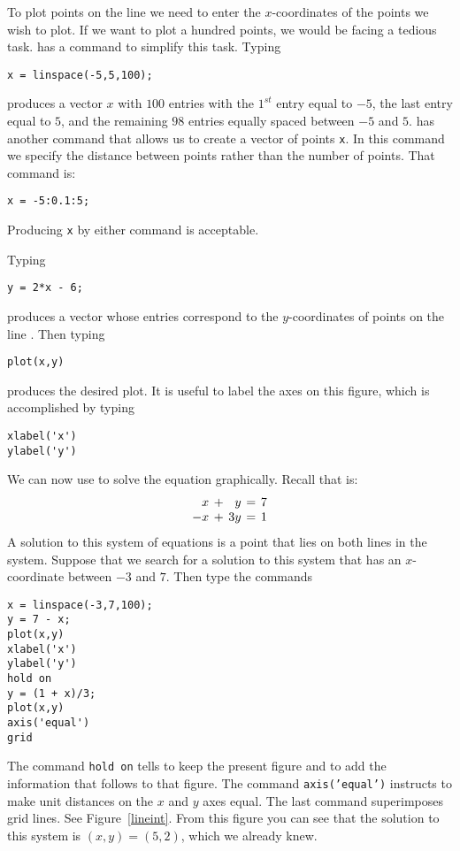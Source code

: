 To plot points on the line
 we need to enter the $x$-coordinates of the points
we wish to plot.  If we want to plot a hundred points, we would
be facing a tedious task.  \Matlab has a command to simplify
this task. Typing
\begin{verbatim}
x = linspace(-5,5,100);
\end{verbatim} 
produces a vector $x$ with $100$ entries with the $1^{st}$ entry
equal to $-5$, the last entry equal to $5$, and the remaining $98$ 
entries equally spaced between $-5$ and $5$.  \Matlab has another command 
that allows us to create a vector of points {\tt x}.  In this command
we specify the distance between points rather than the number of 
points.  That command is:
\begin{verbatim}
x = -5:0.1:5;
\end{verbatim}
Producing {\tt x} by either command is acceptable.

Typing
\begin{verbatim}
y = 2*x - 6;
\end{verbatim}
produces a vector whose entries correspond to the
$y$-coordinates of points on the line .  Then typing
\begin{verbatim}
plot(x,y)
\end{verbatim}
produces the desired plot.  It is useful to label the axes on
this figure, which is accomplished by typing
\begin{verbatim}
xlabel('x')
ylabel('y')
\end{verbatim} 

We can now use \Matlab to solve the equation 
graphically.  Recall that  is:
\[
\arraycolsep 2pt
\begin{array}{rcrcr}
 x & + &  y & = & 7 \\
-x & + & 3y & = & 1
\end{array}
\]
A solution to this system of equations is a point that lies on
both lines in the system.  Suppose that we search for a solution
to this system that has an $x$-coordinate between $-3$ and $7$.
Then type the commands
\begin{verbatim}
x = linspace(-3,7,100);
y = 7 - x;
plot(x,y)
xlabel('x')
ylabel('y')
hold on
y = (1 + x)/3;
plot(x,y)
axis('equal')
grid
\end{verbatim}  
The \Matlab command {\tt hold on} tells \Matlab to keep the
present figure and to add the information that follows to that figure.
The command {\tt axis('equal')} instructs \Matlab to make unit distances
on the $x$ and $y$ axes equal.  The last \Matlab command superimposes
grid lines. See Figure~\ref{lineint}.  From this figure
you can see that the solution to this system is $(x,y)=(5,2)$, which
we already knew.

